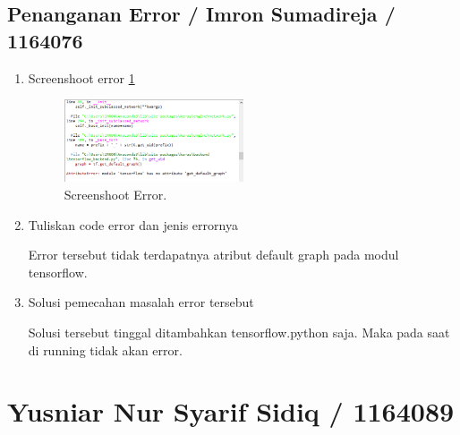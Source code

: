 \subsection{Penanganan Error / Imron Sumadireja / 1164076}
\begin{enumerate}
\item Screenshoot error \ref{mathError}
		\begin{figure}[!htbp]
		\centerline{\includegraphics[width=0.5\textwidth]{figures/im/mathError.png}}
		\caption{Screenshoot Error.}
		\label{mathError}
		\end{figure}

\item Tuliskan code error dan jenis errornya \par

Error tersebut tidak terdapatnya atribut default graph pada modul tensorflow.

\item Solusi pemecahan masalah error tersebut \par

Solusi tersebut tinggal ditambahkan tensorflow.python saja. Maka pada saat di running tidak akan error.
\end{enumerate}



\section{Yusniar Nur Syarif Sidiq / 1164089}
